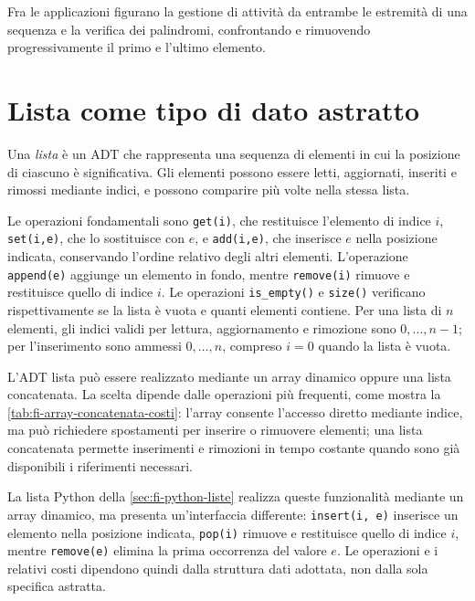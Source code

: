 Fra le applicazioni figurano la gestione di attività da entrambe
le estremità di una sequenza e la verifica dei palindromi,
confrontando e rimuovendo progressivamente il primo e
l'ultimo elemento.

\section{Lista come tipo di dato astratto}
\label{sec:fi-adt-lista}

\begin{definition}[Lista]
\label{def:fi-adt-lista}
Una \emph{lista} è un ADT che rappresenta una sequenza di elementi
in cui la posizione di ciascuno è significativa. Gli elementi
possono essere letti, aggiornati, inseriti e rimossi mediante
indici, e possono comparire più volte nella stessa lista.
\end{definition}

Le operazioni fondamentali sono \texttt{get(i)}, che restituisce
l'elemento di indice \(i\), \texttt{set(i,e)}, che lo sostituisce
con \(e\), e \texttt{add(i,e)}, che inserisce \(e\) nella posizione
indicata, conservando l'ordine relativo degli altri elementi.
L'operazione \texttt{append(e)} aggiunge un elemento in fondo,
mentre \texttt{remove(i)} rimuove e restituisce quello di indice
\(i\).
Le operazioni \texttt{is\_empty()} e \texttt{size()} verificano
rispettivamente se la lista è vuota e quanti elementi contiene.
Per una lista di \(n\) elementi, gli indici validi per lettura,
aggiornamento e rimozione sono \(0,\ldots,n-1\); per
l'inserimento sono ammessi \(0,\ldots,n\), compreso \(i=0\)
quando la lista è vuota.

L'ADT lista può essere realizzato mediante un array dinamico
oppure una lista concatenata. La scelta dipende dalle operazioni
più frequenti, come mostra la \cref{tab:fi-array-concatenata-costi}:
l'array consente l'accesso diretto mediante indice, ma può richiedere
spostamenti per inserire o rimuovere elementi; una lista concatenata
permette inserimenti e rimozioni in tempo costante quando sono già
disponibili i riferimenti necessari.

La lista Python della \cref{sec:fi-python-liste} realizza
queste funzionalità mediante un array dinamico, ma presenta
un'interfaccia differente: \texttt{insert(i, e)} inserisce
un elemento nella posizione indicata, \texttt{pop(i)}
rimuove e restituisce quello di indice \(i\), mentre
\texttt{remove(e)} elimina la prima occorrenza del valore \(e\).
Le operazioni e i relativi costi dipendono quindi dalla
struttura dati adottata, non dalla sola specifica astratta.


